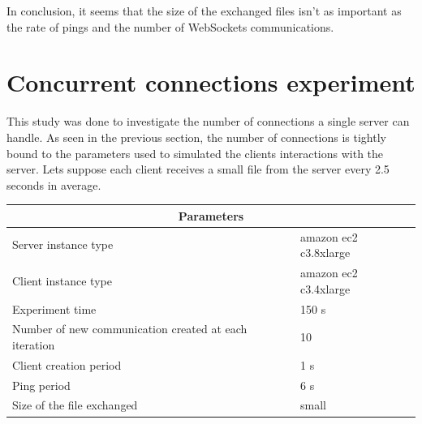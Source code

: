 In conclusion, it seems that the size of the exchanged files isn't as important
as the rate of pings and the number of WebSockets communications.


\section{Concurrent connections experiment}

This study was done to investigate the number of connections a
single server can handle. As seen in the previous section, the number of
connections is tightly bound to the parameters used to simulated the clients
interactions with the server.  Lets suppose each client receives a small file
from the server every 2.5 seconds in average.

\begin{center}
  \begin{tabular}{ | l | l |}
  \hline
  \multicolumn{2}{|c|}{Parameters} \\
  \hline
    Server instance type &  amazon ec2 c3.8xlarge\\ 
    Client instance type & amazon ec2 c3.4xlarge\\
    Experiment time & 150 s \\
    Number of new communication created at each iteration & 10 \\
    Client creation period & 1 s \\
    Ping period & 6 s \\ 
    Size of the file exchanged & small \\
  \hline
  \end{tabular}
\end{center}


